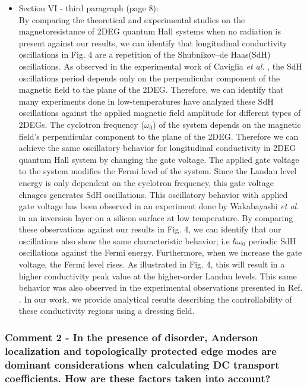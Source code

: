 \documentclass{article}
\begin{document}
\begin{itemize}
  \item Section VI - third paragraph (page 8):\\
  {\color{Red}
  By comparing the theoretical \cite{ando72,ando74_1,ando74_2,ando74_3,ando74_4,ando82,endo09} and experimental \cite{endo09,wakabayashi78,ochiai190,mancoff96,arapov02,grbic04,caviglia10} studies on the magnetoresistance of 2DEG quantum Hall systems when no radiation is present against our results, we can identify that longitudinal conductivity oscillations in Fig. 4 are a repetition of the Shubnikov–de Haas(SdH) oscillations.
  As observed in the experimental work of Caviglia \textit{et al.} \cite{caviglia10}, the SdH oscillations period depends only on the perpendicular component of the magnetic field to the plane of the 2DEG.
  Therefore, we can identify that many experiments done in low-temperatures \cite{endo09,ochiai190,mancoff96,arapov02,grbic04,caviglia10} have analyzed these SdH oscillations against the applied magnetic field amplitude for different types of 2DEGs.
  The cyclotron frequency ($\omega_0$) of the system depends on the magnetic field's perpendicular component to the plane of the 2DEG.
  Therefore we can achieve the same oscillatory behavior for longitudinal conductivity in 2DEG quantum Hall system by changing the gate voltage.
  The applied gate voltage to the system modifies the Fermi level of the system.
  Since the Landau level energy is only dependent on the cyclotron frequency, this gate voltage chnages generates SdH oscillations.
  This oscillatory behavior with applied gate voltage has been observed in an  experiment done by Wakabayashi \textit{et al.} \cite{wakabayashi78} in an inversion layer on a silicon surface at low temperature.
  By comparing these observations against our results in Fig. 4, we can identify that our oscillations also show the same characteristic behavior; i.e  $\hbar\omega_0$ periodic SdH oscillations against the Fermi energy.
  Furthermore, when we increase the gate voltage, the Fermi level rises. As illustrated in Fig. 4, this will result in a higher conductivity peak value at the higher-order Landau levels. This same behavior was also observed in the experimental observations presented in Ref. \cite{wakabayashi78}.
  In our work, we provide analytical results describing the controllability of these conductivity regions using a dressing field.
  }
\end{itemize}

\subsubsection*{Comment 2 -
\color{RoyalBlue} In the presence of disorder, Anderson localization and topologically protected edge modes are dominant considerations when calculating DC transport coefficients. How are these factors taken into account?
}
\end{document}
